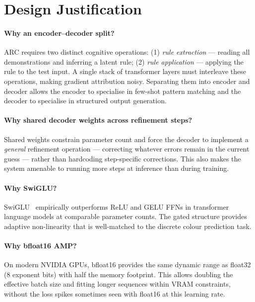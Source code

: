 \documentclass[11pt,a4paper]{article}
\begin{document}
\section{Design Justification}
\label{sec:design}

\paragraph{Why an encoder–decoder split?}
ARC requires two distinct cognitive operations: (1) \emph{rule extraction} — reading
all demonstrations and inferring a latent rule; (2) \emph{rule application} — applying
the rule to the test input.  A single stack of transformer layers must interleave these
operations, making gradient attribution noisy.  Separating them into encoder and decoder
allows the encoder to specialise in few-shot pattern matching and the decoder to
specialise in structured output generation.

\paragraph{Why shared decoder weights across refinement steps?}
Shared weights constrain parameter count and force the decoder to implement a
\emph{general} refinement operation — correcting whatever errors remain in the current
guess — rather than hardcoding step-specific corrections.  This also makes the system
amenable to running more steps at inference than during training.

\paragraph{Why SwiGLU?}
SwiGLU~\cite{shazeer2020glu} empirically outperforms ReLU and GELU FFNs in transformer
language models at comparable parameter counts.  The gated structure provides adaptive
non-linearity that is well-matched to the discrete colour prediction task.

\paragraph{Why bfloat16 AMP?}
On modern NVIDIA GPUs, bfloat16 provides the same dynamic range as float32 (8 exponent
bits) with half the memory footprint.  This allows doubling the effective batch size
and fitting longer sequences within VRAM constraints, without the loss spikes sometimes
seen with float16 at this learning rate.
\end{document}
